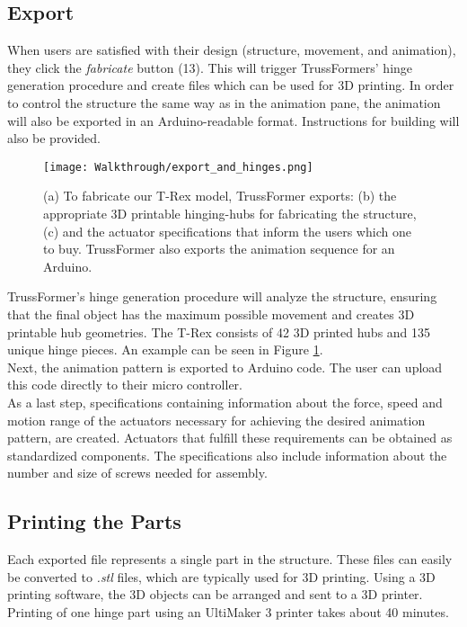 \subsection{Export}
When users are satisfied with their design (structure, movement, and animation), they click the \textit{fabricate} button (13). This will trigger TrussFormers' hinge generation procedure and create files which can be used for 3D printing. In order to control the structure the same way as in the animation pane, the animation will also be exported in an Arduino-readable format. Instructions for building will also be provided.
\begin{figure}[ht!]
    \texttt{[image: Walkthrough/export\_and\_hinges.png]}
    \centering
    \caption{(a) To fabricate our T-Rex model, TrussFormer exports: (b) the appropriate 3D printable hinging-hubs for fabricating the structure, (c) and the actuator specifications that inform the users which one to buy. TrussFormer also exports the animation sequence for an Arduino.}
    \label{fig:export_and_hinges}
\end{figure}

TrussFormer's hinge generation procedure will analyze the structure, ensuring that the final object has the maximum possible movement and creates 3D printable hub geometries. The T-Rex consists of 42 3D printed hubs and 135 unique hinge pieces. An example can be seen in Figure \ref{fig:export_and_hinges}.\\
Next, the animation pattern is exported to Arduino code. The user can upload this code directly to their micro controller.\\
As a last step, specifications containing information about the force, speed and motion range of the actuators necessary for achieving the desired animation pattern, are created. Actuators that fulfill these requirements can be obtained as standardized components. The specifications also include information about the number and size of screws needed for assembly.

\subsection{Printing the Parts}
Each exported file represents a single part in the structure. These files can easily be converted to \textit{.stl} files, which are typically used for 3D printing. Using a 3D printing software, the 3D objects can be arranged and sent to a 3D printer. Printing of one hinge part using an UltiMaker 3 printer takes about 40 minutes.

